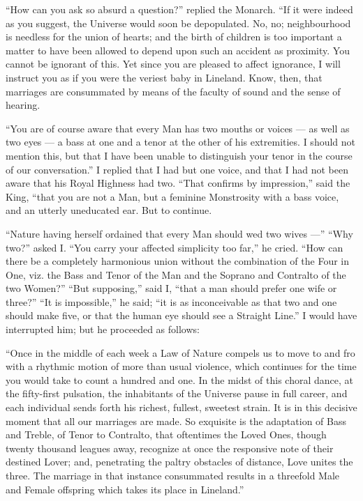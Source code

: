 \documentclass[12pt, a4paper, oneside]{memoir}
\begin{document}
``How can you ask so absurd a question?'' replied the Monarch. ``If it were
indeed as you suggest, the Universe would soon be depopulated. No, no;
neighbourhood is needless for the union of hearts; and the birth of children
is too important a matter to have been allowed to depend upon such an accident
as proximity. You cannot be ignorant of this. Yet since you are pleased to
affect ignorance, I will instruct you as if you were the veriest baby in
Lineland. Know, then, that marriages are consummated by means of the faculty
of sound and the sense of hearing.

``You are of course aware that every Man has two mouths or voices --- as well as
two eyes --- a bass at one and a tenor at the other of his extremities. I should
not mention this, but that I have been unable to distinguish your tenor in the
course of our conversation.'' I replied that I had but one voice, and that I
had not been aware that his Royal Highness had two. ``That confirms by
impression,'' said the King, ``that you are not a Man, but a feminine
Monstrosity with a bass voice, and an utterly uneducated ear. But to continue.

``Nature having herself ordained that every Man should wed two wives ---'' ``Why
two?'' asked I. ``You carry your affected simplicity too far,'' he cried. ``How
can there be a completely harmonious union without the combination of the Four
in One, viz. the Bass and Tenor of the Man and the Soprano and Contralto of
the two Women?'' ``But supposing,'' said I, ``that a man should prefer one wife or
three?'' ``It is impossible,'' he said; ``it is as inconceivable as that two and
one should make five, or that the human eye should see a Straight Line.'' I
would have interrupted him; but he proceeded as follows:

``Once in the middle of each week a Law of Nature compels us to move to and fro
with a rhythmic motion of more than usual violence, which continues for the
time you would take to count a hundred and one. In the midst of this choral
dance, at the fifty-first pulsation, the inhabitants of the Universe pause in
full career, and each individual sends forth his richest, fullest, sweetest
strain. It is in this decisive moment that all our marriages are made. So
exquisite is the adaptation of Bass and Treble, of Tenor to Contralto, that
oftentimes the Loved Ones, though twenty thousand leagues away, recognize at
once the responsive note of their destined Lover; and, penetrating the paltry
obstacles of distance, Love unites the three. The marriage in that instance
consummated results in a threefold Male and Female offspring which takes its
place in Lineland.''
\end{document}
